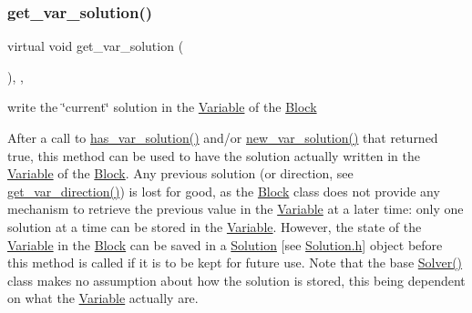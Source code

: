 \subsubsection{\texorpdfstring{get\+\_\+var\+\_\+solution()}{get\_var\_solution()}}
{\footnotesize\ttfamily virtual void get\+\_\+var\+\_\+solution (\begin{DoxyParamCaption}\item[{void}]{ }\end{DoxyParamCaption})\hspace{0.3cm}{\ttfamily [inline]}, {\ttfamily [override]}, {\ttfamily [virtual]}}



write the \char`\"{}current\char`\"{} solution in the \mbox{\hyperlink{class_s_m_spp__di__unipi__it_1_1_variable}{Variable}} of the \mbox{\hyperlink{class_s_m_spp__di__unipi__it_1_1_block}{Block}} 

After a call to \mbox{\hyperlink{class_s_m_spp__di__unipi__it_1_1_fake_solver_ade6d8078e2b6708ea0fa989629de2419}{has\+\_\+var\+\_\+solution()}} and/or \mbox{\hyperlink{class_s_m_spp__di__unipi__it_1_1_solver_af109b504a566c90a4ea45c1574c128fe}{new\+\_\+var\+\_\+solution()}} that returned true, this method can be used to have the solution actually written in the \mbox{\hyperlink{class_s_m_spp__di__unipi__it_1_1_variable}{Variable}} of the \mbox{\hyperlink{class_s_m_spp__di__unipi__it_1_1_block}{Block}}. Any previous solution (or direction, see \mbox{\hyperlink{class_s_m_spp__di__unipi__it_1_1_solver_a4bc119810c0c2ee3ba0c48183f50aaf4}{get\+\_\+var\+\_\+direction()}}) is lost for good, as the \mbox{\hyperlink{class_s_m_spp__di__unipi__it_1_1_block}{Block}} class does not provide any mechanism to retrieve the previous value in the \mbox{\hyperlink{class_s_m_spp__di__unipi__it_1_1_variable}{Variable}} at a later time\+: only one solution at a time can be stored in the \mbox{\hyperlink{class_s_m_spp__di__unipi__it_1_1_variable}{Variable}}. However, the state of the \mbox{\hyperlink{class_s_m_spp__di__unipi__it_1_1_variable}{Variable}} in the \mbox{\hyperlink{class_s_m_spp__di__unipi__it_1_1_block}{Block}} can be saved in a \mbox{\hyperlink{class_s_m_spp__di__unipi__it_1_1_solution}{Solution}} \mbox{[}see \mbox{\hyperlink{_solution_8h}{Solution.\+h}}\mbox{]} object before this method is called if it is to be kept for future use. Note that the base \mbox{\hyperlink{class_s_m_spp__di__unipi__it_1_1_solver_a6a5e38de103dc5a46feb9bd4ac48c3d5}{Solver()}} class makes no assumption about how the solution is stored, this being dependent on what the \mbox{\hyperlink{class_s_m_spp__di__unipi__it_1_1_variable}{Variable}} actually are.


